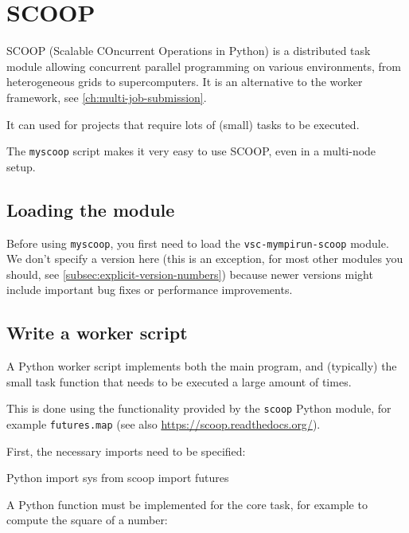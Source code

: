 \chapter{SCOOP}
\label{ch:scoop}

SCOOP (Scalable COncurrent Operations in Python) is a distributed task module allowing
concurrent parallel programming on various environments, from heterogeneous grids to supercomputers.
It is an alternative to the worker framework, see \autoref{ch:multi-job-submission}.


It can used for projects that require lots of (small) tasks to be executed.

The \lstinline|myscoop| script makes it very easy to use SCOOP, even in a multi-node setup.

\section{Loading the module}

Before using \lstinline|myscoop|, you first need to load the \lstinline|vsc-mympirun-scoop| module. We don't specify
a version here (this is an exception, for most other modules you should, see \autoref{subsec:explicit-version-numbers})
because newer versions might include important bug fixes or performance improvements.

\begin{prompt}
\end{prompt}

\section{Write a worker script}

A Python worker script implements both the main program, and (typically) the small task
function that needs to be executed a large amount of times.

This is done using the functionality provided by the \lstinline|scoop| Python module,
for example \lstinline|futures.map| (see also \url{https://scoop.readthedocs.org/}).

First, the necessary imports need to be specified:

\begin{code}{Python}
import sys
from scoop import futures
\end{code}

A Python function must be implemented for the core task, for example to compute the square of a number:

